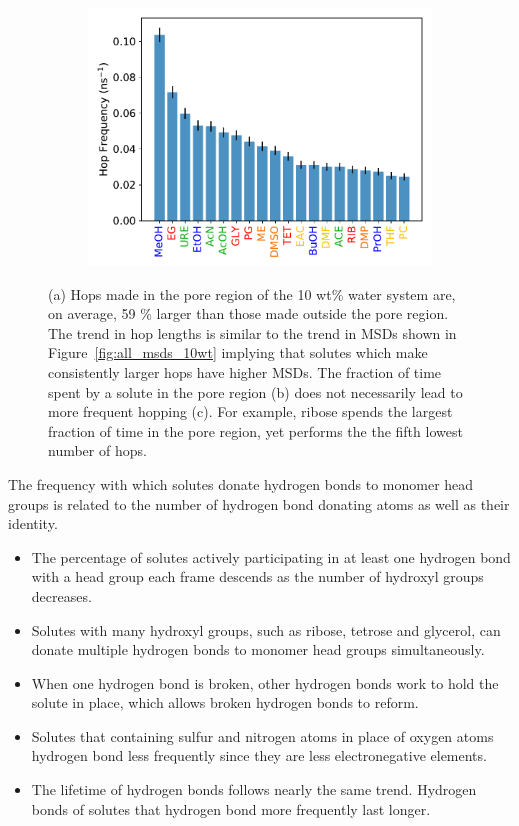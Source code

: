 \documentclass{article}
\begin{document}
\begin{figure}
\begin{subfigure}{0.325\textwidth}
  \includegraphics[width=\textwidth]{hopfreq_total.pdf}
  \caption{}\label{fig:hopfreq}
  \end{subfigure}
  \caption{(a) Hops made in the pore region of the 10 wt\% water system
  are, on average, 59 \% larger than those made outside the pore region.
  The trend in hop lengths is similar to the trend in MSDs shown in
  Figure~\ref{fig:all_msds_10wt} implying that solutes which make consistently
  larger hops have higher MSDs. The fraction of time spent by a solute in the
  pore region (b) does not necessarily lead to more frequent hopping (c). For
  example, ribose spends the largest fraction of time in the pore region, yet
  performs the the fifth lowest number of hops.}\label{fig:hops}
  \end{figure}
  
  \noindent The frequency with which solutes donate hydrogen bonds to monomer
  head groups is related to the number of hydrogen bond donating atoms as well
  as their identity.
  \begin{itemize}
    \item The percentage of solutes actively participating in at least one
    hydrogen bond with a head group each frame descends as the number of 
    hydroxyl groups decreases.
    \item Solutes with many hydroxyl groups, such as ribose, tetrose and 
    glycerol, can donate multiple hydrogen bonds to monomer head groups 
    simultaneously. 
    \item When one hydrogen bond is broken, other hydrogen bonds work to
    hold the solute in place, which allows broken hydrogen bonds to reform.
    \item Solutes that containing sulfur and nitrogen atoms in place of 
    oxygen atoms hydrogen bond less frequently since they are less 
    electronegative elements. %
    \item The lifetime of hydrogen bonds follows nearly the same trend. Hydrogen
    bonds of solutes that hydrogen bond more frequently last longer. 
  \end{itemize}
  
\end{document}
